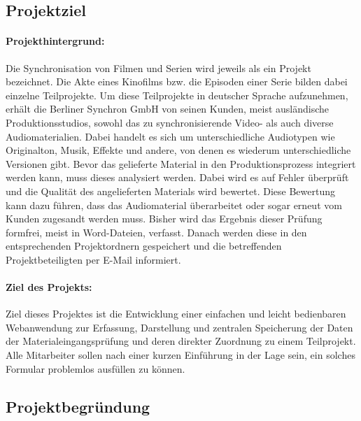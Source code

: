 \subsection{Projektziel} 
\label{sec:Projektziel}
\paragraph*{Projekthintergrund: } Die Synchronisation von Filmen und Serien wird jeweils als ein Projekt bezeichnet. Die Akte eines Kinofilms bzw. die Episoden einer Serie bilden dabei einzelne Teilprojekte. Um diese Teilprojekte in deutscher Sprache aufzunehmen, erhält die Berliner Synchron GmbH von seinen Kunden, meist ausländische Produktionsstudios, sowohl das zu synchronisierende Video- als auch diverse Audiomaterialien. Dabei handelt es sich um unterschiedliche Audiotypen wie Originalton, Musik, Effekte und andere, von denen es wiederum unterschiedliche Versionen gibt. Bevor das gelieferte Material in den Produktionsprozess integriert werden kann, muss dieses analysiert werden. Dabei wird es auf Fehler überprüft und die Qualität des angelieferten Materials wird bewertet. Diese Bewertung kann dazu führen, dass das Audiomaterial überarbeitet oder sogar erneut vom Kunden zugesandt werden muss. Bisher wird das Ergebnis dieser Prüfung formfrei, meist in Word-Dateien, verfasst. Danach werden diese in den entsprechenden Projektordnern gespeichert und die betreffenden Projektbeteiligten per E-Mail informiert.

\paragraph*{Ziel des Projekts: } Ziel dieses Projektes ist die Entwicklung einer einfachen und leicht bedienbaren Webanwendung zur Erfassung, Darstellung und zentralen Speicherung der Daten der Materialeingangsprüfung und deren direkter Zuordnung zu einem Teilprojekt. Alle Mitarbeiter sollen nach einer kurzen Einführung in der Lage sein, ein solches Formular problemlos ausfüllen zu können.

\subsection{Projektbegründung} 
\label{sec:Projektbegruendung}
